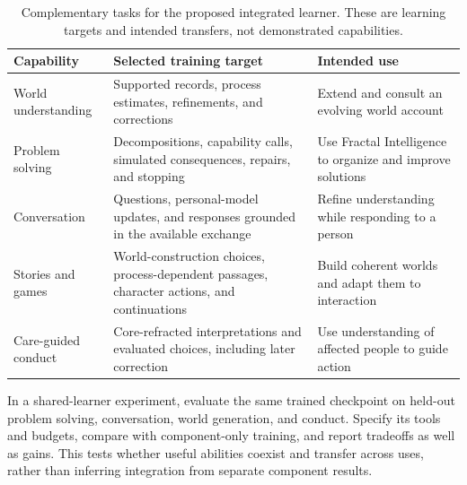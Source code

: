 \documentclass[10pt]{article}
\begin{document}
\begin{table}[!htbp]
\centering
\small
\begin{tabularx}{\textwidth}{@{}p{}YY@{}}
\toprule
Capability & Selected training target & Intended use \\
\midrule
World understanding & Supported records, process estimates, refinements,
and corrections & Extend and consult an evolving world account \\
Problem solving & Decompositions, capability calls, simulated consequences,
repairs, and stopping & Use Fractal Intelligence to organize and improve solutions \\
Conversation & Questions, personal-model updates, and responses grounded in
the available exchange & Refine understanding while responding to a person \\
Stories and games & World-construction choices, process-dependent passages,
character actions, and continuations & Build coherent worlds and adapt them to interaction \\
Care-guided conduct & Core-refracted interpretations and evaluated choices,
including later correction & Use understanding of affected people to guide action \\
\bottomrule
\end{tabularx}
\caption{Complementary tasks for the proposed integrated learner. These are
learning targets and intended transfers, not demonstrated capabilities.}
\label{tab:learning-to-use}
\end{table}

In a shared-learner experiment, evaluate the same trained checkpoint on held-out
problem solving, conversation, world generation, and conduct. Specify its
tools and budgets, compare with component-only training, and report tradeoffs
as well as gains. This tests whether useful abilities coexist and transfer
across uses, rather than inferring integration from separate component results.
\end{document}
